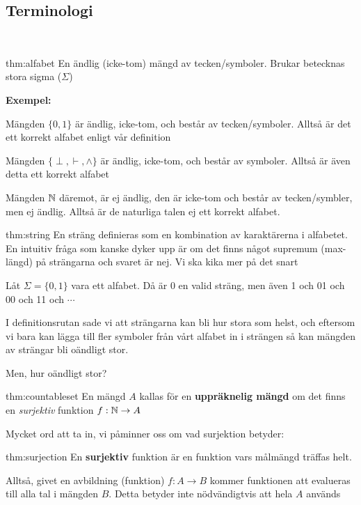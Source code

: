\subsection{Terminologi}\hfill\\
\par
\begin{theo}[Alfabet]{thm:alfabet}
  En ändlig (icke-tom) mängd av tecken/symboler. Brukar betecknas stora sigma ($\Sigma$)
\end{theo}
\par\bigskip
\noindent\textbf{Exempel:}\par\bigskip
\noindent Mängden $\{0,1\}$ är ändlig, icke-tom, och består av tecken/symboler. Alltså är det ett korrekt alfabet enligt vår definition\par\bigskip
\noindent Mängden $\{\perp,\vdash,\wedge\}$ är ändlig, icke-tom, och består av symboler. Alltså är även detta ett korrekt alfabet\par\bigskip
\noindent Mängden $\mathbb{N}$ däremot, är ej ändlig, den är icke-tom och består av tecken/symbler, men ej ändlig. Alltså är de naturliga talen ej ett korrekt alfabet.
\par\bigskip
\begin{theo}[Sträng]{thm:string}
  En sträng definieras som en kombination av karaktärerna i alfabetet. En intuitiv fråga som kanske dyker upp är om det finns något supremum (max-längd) på strängarna och svaret är nej. Vi ska kika mer på det snart
  \par\bigskip
  \noindent Låt $\Sigma = \{0,1\}$ vara ett alfabet. Då är 0 en valid sträng, men även 1 och 01 och 00 och 11 och $\cdots$
\end{theo}
\par\bigskip
\noindent I definitionsrutan sade vi att strängarna kan bli hur stora som helst, och eftersom vi bara kan lägga till fler symboler från vårt alfabet in i strängen så kan mängden av strängar bli oändligt stor.\par
\noindent Men, hur oändligt stor?
\par\bigskip
\begin{theo}{thm:countableset}
  En mängd $A$ kallas för en \textbf{uppräknelig mängd} om det finns en \textit{surjektiv} funktion $f:\mathbb{N}\to A$
\end{theo}
\par\bigskip
\noindent Mycket ord att ta in, vi påminner oss om vad surjektion betyder:
\par\bigskip
\begin{theo}[Surjektiv]{thm:surjection}
  En \textbf{surjektiv} funktion är en funktion vars målmängd träffas helt.\par
  \noindent Alltså, givet en avbildning (funktion) $f:A\to B$ kommer funktionen att evalueras till alla tal i mängden $B$. Detta betyder inte nödvändigtvis att hela $A$ används
\end{theo}
